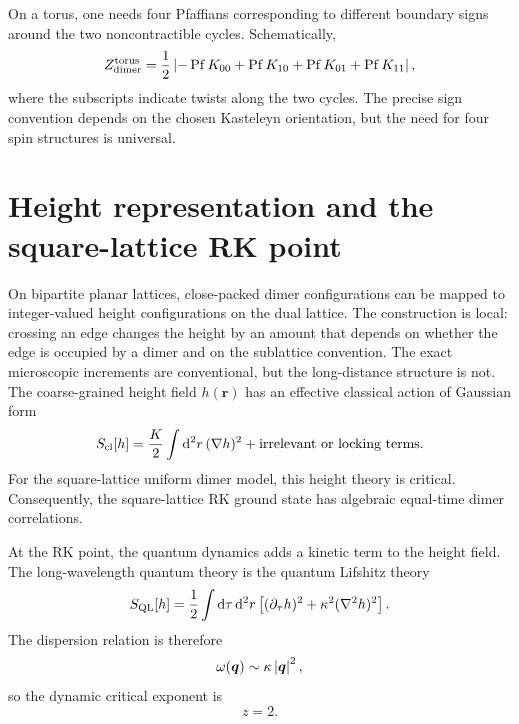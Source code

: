 On a torus, one needs four Pfaffians corresponding to different boundary signs
around the two noncontractible cycles.  Schematically,
\begin{equation}
\label{eq:torus-dimer-four-pfaffians}
    Z_{\rm dimer}^{\rm torus}
    =
    \frac{1}{2}
    \left|
        -\operatorname{Pf} K_{00}
        +\operatorname{Pf} K_{10}
        +\operatorname{Pf} K_{01}
        +\operatorname{Pf} K_{11}
    \right|,
\end{equation}
where the subscripts indicate twists along the two cycles.  The precise sign
convention depends on the chosen Kasteleyn orientation, but the need for four
spin structures is universal.

\section{Height representation and the square-lattice RK point}
\label{sec:qdm-height-representation}

On bipartite planar lattices, close-packed dimer configurations can be mapped to
integer-valued height configurations on the dual lattice.  The construction is
local: crossing an edge changes the height by an amount that depends on whether
the edge is occupied by a dimer and on the sublattice convention.  The exact
microscopic increments are conventional, but the long-distance structure is not.
The coarse-grained height field \(h(\bm r)\) has an effective classical action
of Gaussian form
\begin{equation}
\label{eq:classical-dimer-height-action}
    S_{\rm cl}[h]
    =
    \frac{K}{2}
    \int \mathrm{d}^2 r\,
    (\nabla h)^2
    +\text{irrelevant or locking terms} .
\end{equation}
For the square-lattice uniform dimer model, this height theory is critical.
Consequently, the square-lattice RK ground state has algebraic equal-time dimer
correlations.

At the RK point, the quantum dynamics adds a kinetic term to the height field.
The long-wavelength quantum theory is the quantum Lifshitz theory
\begin{equation}
\label{eq:quantum-lifshitz-action}
    S_{\rm QL}[h]
    =
    \frac{1}{2}
    \int \mathrm{d}\tau\,\mathrm{d}^2 r
    \left[
        (\partial_{\tau}h)^2
        +
        \kappa^2(\nabla^2 h)^2
    \right] .
\end{equation}
The dispersion relation is therefore
\begin{equation}
\label{eq:quantum-lifshitz-dispersion}
    \omega(\bm q)\sim \kappa \left|\bm q\right|^2,
\end{equation}
so the dynamic critical exponent is
\begin{equation}
\label{eq:rk-dynamical-exponent}
    z=2 .
\end{equation}

